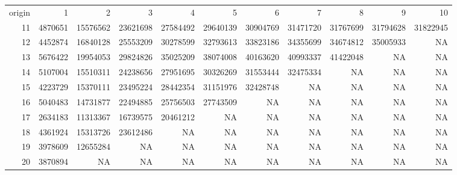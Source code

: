 \documentclass[a4paper]{article}
\begin{document}
\begin{table}[ht]
\centering
\begin{tabular}{rrrrrrrrrrr}

  \hline
origin    & 1 & 2 & 3 & 4 & 5 & 6 & 7 & 8 & 9 & 10 \\ 
       11 &4870651& 15576562& 23621698& 27584492& 29640139& 30904769& 31471720& 31767699 &31794628 &31822945\\
       12& 4452874 &16840128 &25553209& 30278599& 32793613 &33823186 &34355699& 34674812& 35005933  &     NA\\
       13& 5676422& 19954053& 29824826& 35025209& 38074008& 40163620& 40993337& 41422048 &      NA    &   NA\\
       14& 5107004& 15510311& 24238656 &27951695& 30326269& 31553444& 32475334 &      NA  &     NA &      NA\\
       15 &4223729& 15370111 &23495224& 28442354 &31151976& 32428748&       NA   &    NA   &    NA &      NA\\
       16& 5040483 &14731877& 22494885& 25756503& 27743509 &      NA&       NA &      NA&       NA  &     NA\\
       17 &2634183& 11313367& 16739575& 20461212  &     NA&       NA &      NA  &     NA  &     NA &      NA\\
       18& 4361924& 15313726& 23612486 &      NA  &     NA    &   NA  &     NA  &     NA   &    NA &      NA\\
       19& 3978609& 12655284  &     NA &      NA   &    NA  &     NA  &     NA   &    NA   &    NA &      NA\\
       20 &3870894     &  NA    &   NA  &     NA &      NA &      NA    &   NA  &     NA  &     NA   &    NA\\
   \hline
\end{tabular}
\end{table}
\end{document}
